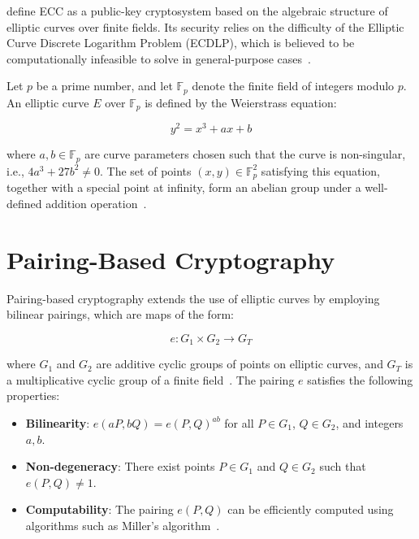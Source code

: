 \documentclass[cic,tc,english]{iiufrgs}
\numberwithin{algorithm}{chapter}
\begin{document}
        \citet{hankerson2004guide} define ECC as a public-key cryptosystem based on the algebraic structure of elliptic curves over finite fields. Its security relies on the difficulty of the Elliptic Curve Discrete Logarithm Problem (ECDLP), which is believed to be computationally infeasible to solve in general-purpose cases~\citep{hankerson2004guide, koblitz1987elliptic}.

        Let $p$ be a prime number, and let $\mathbb{F}_p$ denote the finite field of integers modulo $p$. An elliptic curve $E$ over $\mathbb{F}_p$ is defined by the Weierstrass equation:

        \begin{equation}
        \label{eq:elliptic_curve}
        y^2 = x^3 + ax + b
        \end{equation}

        where $a, b \in \mathbb{F}_p$ are curve parameters chosen such that the curve is non-singular, i.e., $4a^3 + 27b^2 \neq 0$. The set of points $(x, y) \in \mathbb{F}_p^2$ satisfying this equation, together with a special point at infinity, form an abelian group under a well-defined addition operation~\citep{hankerson2004guide}.

    \section{Pairing-Based Cryptography}
        \label{sec:pairing}

        Pairing-based cryptography extends the use of elliptic curves by employing bilinear pairings, which are maps of the form:

        \begin{equation}
        e: G_1 \times G_2 \rightarrow G_T
        \end{equation}

        where $G_1$ and $G_2$ are additive cyclic groups of points on elliptic curves, and $G_T$ is a multiplicative cyclic group of a finite field~\citep{boneh2001identity}. The pairing $e$ satisfies the following properties:

        \begin{itemize}
            \item \textbf{Bilinearity}: $e(aP, bQ) = e(P, Q)^{ab}$ for all $P \in G_1$, $Q \in G_2$, and integers $a, b$.
            \item \textbf{Non-degeneracy}: There exist points $P \in G_1$ and $Q \in G_2$ such that $e(P, Q) \neq 1$.
            \item \textbf{Computability}: The pairing $e(P, Q)$ can be efficiently computed using algorithms such as Miller's algorithm~\citep{miller1986use}.
        \end{itemize}
\end{document}

